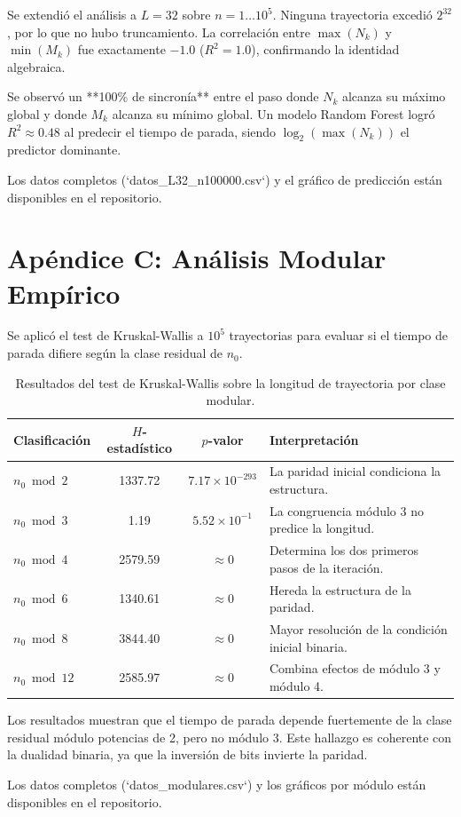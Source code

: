 \documentclass[11pt,a4paper]{article}
\begin{document}
Se extendió el análisis a $L=32$ sobre $n = 1 \dots 10^5$. Ninguna trayectoria excedió $2^{32}$, por lo que no hubo truncamiento. La correlación entre $\max(N_k)$ y $\min(M_k)$ fue exactamente $-1.0$ ($R^2 = 1.0$), confirmando la identidad algebraica.

Se observó un **100\% de sincronía** entre el paso donde $N_k$ alcanza su máximo global y donde $M_k$ alcanza su mínimo global. Un modelo Random Forest logró $R^2 \approx 0.48$ al predecir el tiempo de parada, siendo $\log_2(\max(N_k))$ el predictor dominante.

Los datos completos (`datos_L32_n100000.csv`) y el gráfico de predicción están disponibles en el repositorio.

\section{Apéndice C: Análisis Modular Empírico}
\label{app:C}

Se aplicó el test de Kruskal-Wallis a $10^5$ trayectorias para evaluar si el tiempo de parada difiere según la clase residual de $n_0$.

\begin{table}[h!]
\centering
\caption{Resultados del test de Kruskal-Wallis sobre la longitud de trayectoria por clase modular.}
\label{tab:kruskal}
\small
\begin{tabularx}{\textwidth}{@{} l c c X @{}}
\toprule
Clasificación & $H$-estadístico & $p$-valor & Interpretación \\
\midrule
$n_0 \bmod 2$  & 1337.72  & $7.17 \times 10^{-293}$ & La paridad inicial condiciona la estructura. \\
$n_0 \bmod 3$  & 1.19     & $5.52 \times 10^{-1}$   & La congruencia módulo 3 no predice la longitud. \\
$n_0 \bmod 4$  & 2579.59  & $\approx 0$             & Determina los dos primeros pasos de la iteración. \\
$n_0 \bmod 6$  & 1340.61  & $\approx 0$             & Hereda la estructura de la paridad. \\
$n_0 \bmod 8$  & 3844.40  & $\approx 0$             & Mayor resolución de la condición inicial binaria. \\
$n_0 \bmod 12$ & 2585.97  & $\approx 0$             & Combina efectos de módulo 3 y módulo 4. \\
\bottomrule
\end{tabularx}
\end{table}

Los resultados muestran que el tiempo de parada depende fuertemente de la clase residual módulo potencias de 2, pero no módulo 3. Este hallazgo es coherente con la dualidad binaria, ya que la inversión de bits invierte la paridad.

Los datos completos (`datos_modulares.csv`) y los gráficos por módulo están disponibles en el repositorio.
\end{document}
